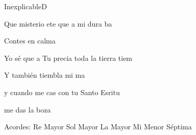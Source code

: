 \documentclass[12pt, spanish]{book}
\begin{document}
\begin{song}{Inexplicable}{D}
\begin{SBOpGroup}
            Que misterio ete que a mi dura ba

            Contes en calma

            Yo sé que a Tu precia toda la tierra tiem

            Y también tiembla mi ma

            y cuando me cas con tu Santo Esritu

            me das la boza
        \end{SBOpGroup}
        \ifChordBk
        \begin{SBOpGroup}
            Acordes:
            \upchord{\D}\qquad Re Mayor \hfill
            \upchord{\G}\qquad Sol Mayor \hfill\null\break
            \upchord{\A}\qquad La Mayor \hfill
            \upchord{\Emseven}\qquad Mi Menor S\'eptima \hfill\null\break
        \end{SBOpGroup}
        \fi
    \end{song}
\end{document}
